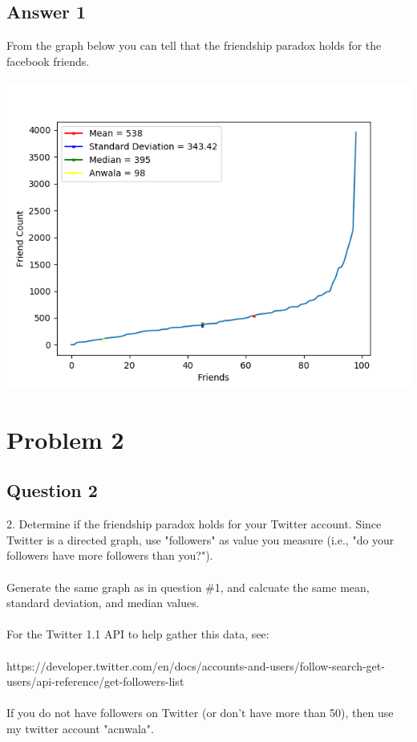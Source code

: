 \documentclass[10pt,letterpaper]{article}
\begin{document}
\subsection{Answer 1}
From the graph below you can tell that the friendship paradox holds for the facebook friends.\\
\\
\includegraphics[scale=1]{Question1.png}
 
\pagebreak 

\section{Problem 2}
\subsection{Question 2}
2.  Determine if the friendship paradox holds for your Twitter account.
Since Twitter is a directed graph, use "followers" as value you measure
(i.e., "do your followers have more followers than you?").\\
\\
Generate the same graph as in question \#1, and calcuate the same 
mean, standard deviation, and median values.\\
\\
For the Twitter 1.1 API to help gather this data, see:\\
\\
https://developer.twitter.com/en/docs/accounts-and-users/follow-search-get-users/api-reference/get-followers-list\\
\\
If you do not have followers on Twitter (or don't have more than 50),
then use my twitter account "acnwala".\\
\\
\end{document}
